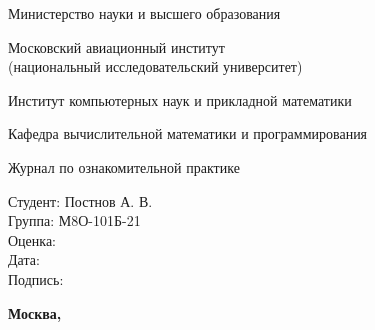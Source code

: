 \documentclass[12pt]{article}
\begin{document}
\begin{titlepage}
\begin{center}
\bfseries

{\Large Министерство науки и высшего образования}

\vspace{12pt}

{\Large Московский авиационный институт \\ (национальный исследовательский университет)}

\vspace{48pt}

\large Институт компьютерных наук и прикладной математики

\vspace{36pt}

\large Кафедра вычислительной математики и программирования

\vspace{72pt}

Журнал по ознакомительной практике \\

\end{center}

\vspace{180pt}

\begin{flushleft}
\hspace{350pt} Студент: Постнов А. В. \\
\hspace{350pt} Группа: М8О-101Б-21 \\
\vspace{5pt}
\hspace{350pt} Оценка: \\
\vspace{5pt}
\hspace{350pt} Дата: \\
\vspace{5pt}
\hspace{350pt} Подпись:
\end{flushleft}

\vspace*{\fill}

\begin{center}
\bfseries
Москва, \the\year
\end{center}
\end{titlepage}

\pagebreak








\pagebreak
\end{document}
